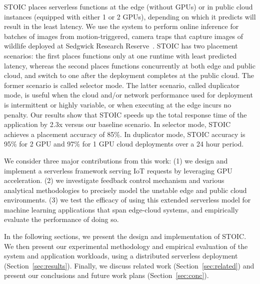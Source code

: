 STOIC places serverless functions at the edge (without GPUs) or in public cloud instances (equipped with either 1 or 2 GPUs), depending on which it predicts will result in the least latency. We use the system to perform online inference for batches of images from motion-triggered, camera traps that capture images of wildlife deployed at Sedgwick Research Reserve~\cite{ref:sedgwick}. STOIC has two placement scenarios: the first places functions only at one runtime with least predicted latency, whereas the second places functions concurrently at both edge and public cloud, and switch to one after the deployment completes at the public cloud. The former scenario is called selector mode. The latter scenario, called duplicator mode, is useful when the cloud and/or network performance used for deployment is intermittent or highly variable, or when executing at the edge incurs no penalty. Our results show that STOIC speeds up the total response time of the application by 2.3x versus our baseline scenario. In selector mode, STOIC achieves a placement accuracy of 85\%.  In duplicator mode, STOIC accuracy is 95\% for 2 GPU and 97\% for 1 GPU cloud deployments over a 24 hour period.

We consider three major contributions from this work: (1) we design and implement a serverless framework serving IoT requests by leveraging GPU acceleration. (2) we investigate feedback control mechanism and various analytical methodologies to precisely model the unstable edge and public cloud environments. (3) we test the efficacy of using this extended serverless model for machine learning applications that span edge-cloud systems, and empirically evaluate the performance of doing so. 

 In the following sections, we present the design and implementation of STOIC. We then present our experimental methodology and empirical evaluation of the system and application workloads, using a distributed serverless deployment (Section~\ref{sec:results}). Finally, we discuss related work (Section~\ref{sec:related}) and present our conclusions and future work plans (Section~\ref{sec:conc}).
















